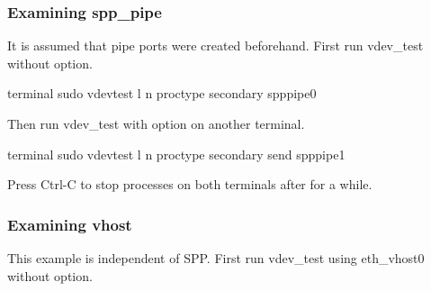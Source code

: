 \documentclass[a4paper,11pt,openany,oneside,english]{sphinxmanual}
\begin{document}
\subsubsection{Examining spp\_pipe}
\label{\detokenize{tools/vdev_test:examining-spp-pipe}}
\begin{figure}[htbp]
\centering

\noindent{}
\end{figure}

It is assumed that pipe ports were created beforehand. First run vdev\_test
without  option.

\begin{sphinxVerbatim}[commandchars=\\\{\},formatcom=\footnotesize]
 terminal 
 sudo vdev\PYGZus{}test \PYGZhy{}l  \PYGZhy{}n  \PYGZhy{}\PYGZhy{}proc\PYGZhy{}type secondary \PYGZhy{}\PYGZhy{} spp\PYGZus{}pipe0
\end{sphinxVerbatim}

Then run vdev\_test with  option on another terminal.

\begin{sphinxVerbatim}[commandchars=\\\{\},formatcom=\footnotesize]
 terminal 
 sudo vdev\PYGZus{}test \PYGZhy{}l  \PYGZhy{}n  \PYGZhy{}\PYGZhy{}proc\PYGZhy{}type secondary \PYGZhy{}\PYGZhy{} \PYGZhy{}\PYGZhy{}send spp\PYGZus{}pipe1
\end{sphinxVerbatim}

Press Ctrl-C to stop processes on both terminals after for a while.


\subsubsection{Examining vhost}
\label{\detokenize{tools/vdev_test:examining-vhost}}
\begin{figure}[htbp]
\centering

\noindent{}
\end{figure}

This example is independent of SPP. First run vdev\_test using eth\_vhost0
without  option.
\end{document}
